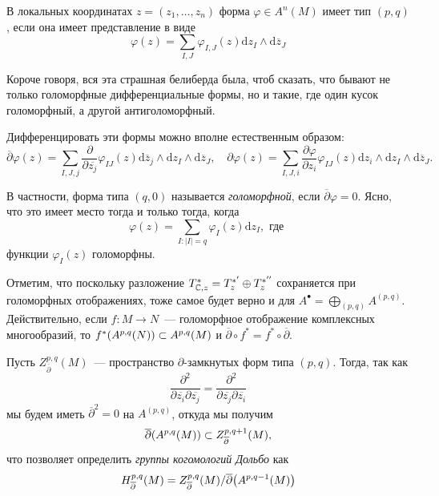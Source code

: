     В локальных координатах $z = (z_{1}, \ldots, z_{n})$ форма $\varphi \in A^{n}(M)$ имеет тип  $(p, q)$, если она имеет
    представление в виде
    \[ \varphi(z) = \sum_{I, J} \varphi_{I, J}(z) \mathrm{d}z_{I} \wedge \mathrm{d}\overline{z}_{J} \]

    \begin{remark}
       Короче говоря, вся эта страшная белиберда была, чтоб сказать, что бывают не только голоморфные дифференциальные формы, но и такие, где
        один кусок голоморфный, а другой антиголоморфный.
    \end{remark}

   Дифференцировать эти формы можно вполне естественным образом:
    \[ \overline{\partial}\varphi(z) = \sum_{I, J, j} \frac{\partial}{\partial \overline{z_{j}}} \varphi_{I J}(z) \mathrm{d}\overline{z}_{j} \wedge \mathrm{d}z_{I} \wedge \mathrm{d}\overline{z}_{J}, \quad \partial \varphi(z) = \sum_{I, J, i} \frac{\partial \varphi}{\partial z_i} \varphi_{I J}(z) \mathrm{d}z_{i} \wedge \mathrm{d}z_{I} \wedge \mathrm{d}\overline{z}_{J}.  \]

    В частности, форма типа $(q, 0)$ называется \emph{голоморфной}, если $\overline{\partial}\varphi = 0$. Ясно, что это имеет место тогда и только тогда, когда 
    \[
       \varphi(z) = \sum_{I\colon |I| = q} \varphi_{I}(z) \mathrm{d}z_{I}, \text{ где }
    \]
    функции $\varphi_{I}(z)$ голоморфны. 

    Отметим, что поскольку разложение $T^{*}_{\mathbb{C}, z} = T^{*'}_{z} \oplus T_{z}^{*''}$ сохраняется при голоморфных отображениях, тоже самое будет верно и для $A^{\bullet} = \bigoplus_{(p, q)} A^{(p, q)}$. Действительно, если $f\colon M \to N$~--- голоморфное отображение комплексных многообразий, то $f^{*}\lr*{A^{p, q}(N)} \subset A^{p, q}(M)$ и $\overline{\partial} \circ f^{*} = f^{*} \circ \overline{\partial}$.

    Пусть $Z^{p, q}_{\overline{\partial}}(M)$~--- пространство $\partial$-замкнутых форм типа $(p, q)$. Тогда, так как
    \[
       \frac{\partial^2}{\partial\overline{z_i}\partial\overline{z_j}} = \frac{\partial^2}{\partial\overline{z_j}\partial\overline{z_i}}
    \]
    мы будем иметь $\overline{\partial}^2 = 0$ на $A^{(p, q)}$, откуда мы получим 
    \[
        \overline{\partial}\lr*{A^{p, q}(M)} \subset Z^{p, q + 1}_{\overline{\partial}}(M),
     \] 
     что позволяет определить \emph{группы когомологий Дольбо} как 
     \[
        H^{p, q}_{\overline{\partial}}(M) = Z^{p, q}_{\overline{\partial}}(M)/\overline{\partial}\lr*{A^{p, q - 1}(M)}
     \]

